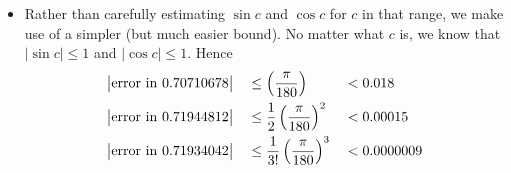 \begin{eg}
\begin{itemize}
\item Rather than carefully estimating $\sin c$ and $\cos c$ for $c$ in that range, we
make use of a simpler (but much easier bound). No matter what $c$ is, we know that $|\sin
c|\le 1$ and $|\cos c|\le 1$. Hence
\begin{alignat*}{3}
&\big|{\rm error\ in\ 0.70710678}\big|&
   &\le  \left(\frac{\pi}{180}\right)&
   &<0.018\\
&\big|{\rm error\ in\ 0.71944812}\big|&
   &\le\frac{1}{2} \left(\frac{\pi}{180}\right)^2&
   &<0.00015\\
&\big|{\rm error\ in\ 0.71934042}\big|&
   &\le \frac{1}{3!} \left(\frac{\pi}{180}\right)^3&
  &<0.0000009
\end{alignat*}
\end{itemize}

\end{eg}
